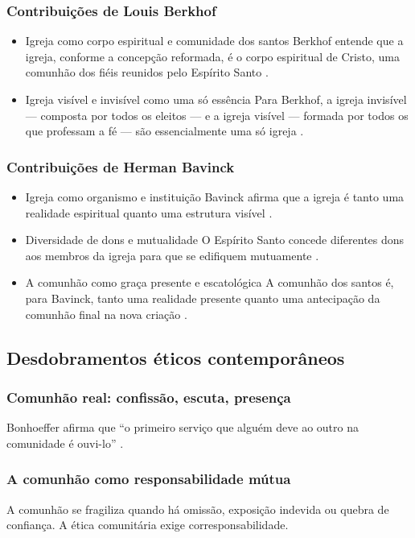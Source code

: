 \subsubsection{Contribuições de Louis Berkhof}
\begin{itemize}
  \item Igreja como corpo espiritual e comunidade dos santos
Berkhof entende que a igreja, conforme a concepção reformada, é o corpo espiritual de Cristo, uma comunhão dos fiéis reunidos pelo Espírito Santo \cite{berkhof2012}.
  \item Igreja visível e invisível como uma só essência
Para Berkhof, a igreja invisível — composta por todos os eleitos — e a igreja visível — formada por todos os que professam a fé — são essencialmente uma só igreja \cite{berkhof2012}.
\end{itemize}

\subsubsection{Contribuições de Herman Bavinck}
\begin{itemize}
  \item Igreja como organismo e instituição
Bavinck afirma que a igreja é tanto uma realidade espiritual quanto uma estrutura visível \cite{bavinck2012}.
  \item Diversidade de dons e mutualidade
O Espírito Santo concede diferentes dons aos membros da igreja para que se edifiquem mutuamente \cite{bavinck2012}.
  \item A comunhão como graça presente e escatológica
A comunhão dos santos é, para Bavinck, tanto uma realidade presente quanto uma antecipação da comunhão final na nova criação \cite{bavinck2012}.
\end{itemize}

\subsection{Desdobramentos éticos contemporâneos}

\subsubsection{Comunhão real: confissão, escuta, presença}
Bonhoeffer afirma que “o primeiro serviço que alguém deve ao outro na comunidade é ouvi-lo” \cite{bonhoeffer2009}.

\subsubsection{A comunhão como responsabilidade mútua}
A comunhão se fragiliza quando há omissão, exposição indevida ou quebra de confiança. A ética comunitária exige corresponsabilidade.

